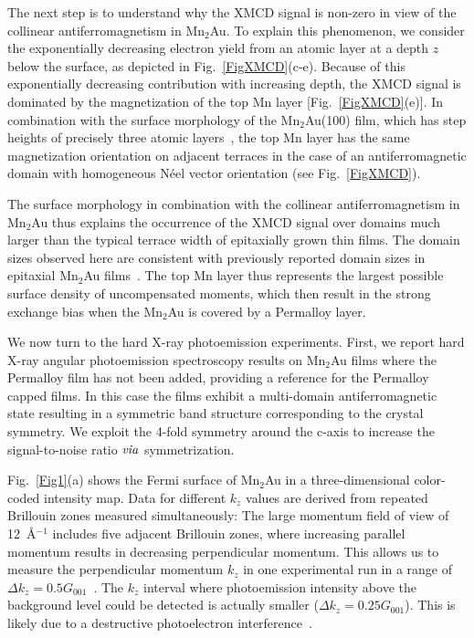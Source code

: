\documentclass[aps,prb,twocolumn,superscriptaddress,10pt]{revtex4-1}
\begin{document}
The next step is to understand why the XMCD signal is non-zero
in view of the collinear antiferromagnetism in Mn$_2$Au.
To explain this phenomenon, we consider the exponentially 
decreasing electron yield from an atomic layer at a depth $z$ below the surface,
as depicted in Fig.~\ref{FigXMCD}(c-e). 
Because of this exponentially decreasing contribution with increasing depth,
the XMCD signal is dominated by the magnetization of the top Mn layer [Fig.~\ref{FigXMCD}(e)].
In combination with the surface morphology of the Mn$_2$Au(100) film,
which has step heights of precisely three atomic layers~\cite{Bommanaboyena2021}, 
the top Mn layer has the same magnetization orientation  on adjacent terraces in the case of an antiferromagnetic domain with homogeneous N{\'e}el vector orientation (see Fig.~\ref{FigXMCD}).

The surface morphology in combination with the collinear antiferromagnetism
in Mn$_2$Au thus explains the occurrence of the XMCD signal 
over domains much larger than the typical terrace width of epitaxially grown thin films.
The domain sizes observed here are consistent with previously reported 
domain sizes in epitaxial Mn$_2$Au films~\cite{Sapozhnik2018}.
The top Mn layer thus represents the largest possible surface density of uncompensated moments,
which then result in the strong exchange bias when the Mn$_2$Au 
is covered by a Permalloy layer.

We now turn to the hard X-ray photoemission experiments.
First, we report hard X-ray angular photoemission spectroscopy results on Mn$_2$Au films
where the Permalloy film has not been added, providing a reference for the Permalloy capped films. 
In this case the films exhibit a multi-domain antiferromagnetic state resulting in a symmetric band structure corresponding to the crystal symmetry.
We exploit the 4-fold symmetry around the c-axis to increase the signal-to-noise ratio $\it via$ symmetrization.

Fig.~\ref{Fig1}(a) shows the Fermi surface of Mn$_2$Au in
a three-dimensional color-coded intensity map.
Data for different $k_z$ values are derived from
repeated Brillouin zones measured simultaneously:
The large momentum field of view of 12~\AA$^{-1}$ includes five adjacent
Brillouin zones, where increasing parallel momentum
results in decreasing perpendicular momentum. 
This allows us to measure the perpendicular momentum $k_z$
in one experimental run in a range of $\Delta k_z = 0.5G_{001}$~\cite{Agustsson2021}.
The $k_z$ interval where photoemission intensity above the background level could be detected
is actually smaller ($\Delta k_z = 0.25G_{001}$). 
This is likely due to a 
destructive photoelectron interference~\cite{Schonhense2019}.
\end{document}
